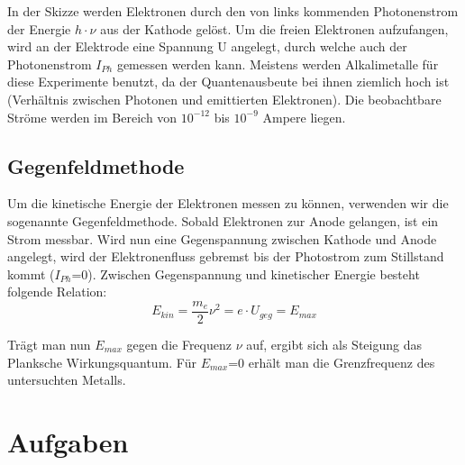 \documentclass{article}
\begin{document}
\begin{center}
\begin{minipage}{\linewidth}
\centering
{}
%
\label{photozelle}
\end{minipage}
\end{center}

In der Skizze werden Elektronen durch den von links kommenden Photonenstrom der Energie \(h\cdot \nu\) aus der Kathode gelöst. Um die freien Elektronen aufzufangen, wird an der Elektrode eine Spannung U angelegt, durch welche auch der Photonenstrom \(I_{Ph}\) gemessen werden kann. Meistens werden Alkalimetalle für diese Experimente benutzt, da der Quantenausbeute bei ihnen ziemlich hoch ist (Verhältnis zwischen Photonen und emittierten Elektronen). Die beobachtbare Ströme werden im Bereich von \(10^{-12}\) bis \(10^{-9}\) Ampere liegen.

\subsection{Gegenfeldmethode}
Um die kinetische Energie der Elektronen messen zu können, verwenden wir die sogenannte Gegenfeldmethode. Sobald Elektronen zur Anode gelangen, ist ein Strom messbar. Wird nun eine Gegenspannung zwischen Kathode und Anode angelegt, wird der Elektronenfluss gebremst bis der Photostrom zum Stillstand kommt (\(I_{Ph}\)=0). Zwischen Gegenspannung und kinetischer Energie besteht folgende Relation:
\begin{equation}
E_{kin}=\frac{m_e}{2}\nu^2 =e\cdot U_{geg} = E_{max}
\end{equation}

Trägt man nun \(E_{max}\) gegen die Frequenz \(\nu\) auf, ergibt sich als Steigung das Planksche Wirkungsquantum. Für \(E_{max}\)=0 erhält man die Grenzfrequenz des untersuchten Metalls.
\newpage
\section{Aufgaben}
\end{document}
